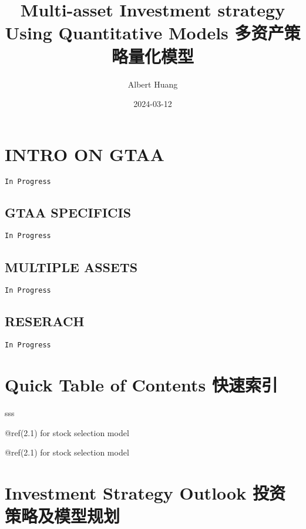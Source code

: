 \documentclass[
]{book}
\title{Multi-asset Investment strategy Using Quantitative Models
多资产策略量化模型}
\author{Albert Huang}
\date{2024-03-12}
\begin{document}
\frontmatter
\maketitle

{
\setcounter{tocdepth}{2}
\tableofcontents
}
\mainmatter
\hypertarget{intro-on-gtaa}{%
\chapter{INTRO ON GTAA}\label{intro-on-gtaa}}

\texttt{In\ Progress}

\hypertarget{gtaa-specificis}{%
\section{GTAA SPECIFICIS}\label{gtaa-specificis}}

\texttt{In\ Progress}

\hypertarget{multiple-assets}{%
\section{MULTIPLE ASSETS}\label{multiple-assets}}

\texttt{In\ Progress}

\hypertarget{reserach}{%
\section{RESERACH}\label{reserach}}

\texttt{In\ Progress}

\hypertarget{quick-table-of-contents-ux5febux901fux7d22ux5f15}{%
\chapter*{Quick Table of Contents
快速索引}\label{quick-table-of-contents-ux5febux901fux7d22ux5f15}}

sss

@ref(2.1) for stock selection model

@ref(2.1) for stock selection model

\hypertarget{investment-strategy-outlook-ux6295ux8d44ux7b56ux7565ux53caux6a21ux578bux89c4ux5212}{%
\chapter{Investment Strategy Outlook
投资策略及模型规划}\label{investment-strategy-outlook-ux6295ux8d44ux7b56ux7565ux53caux6a21ux578bux89c4ux5212}}
\end{document}
